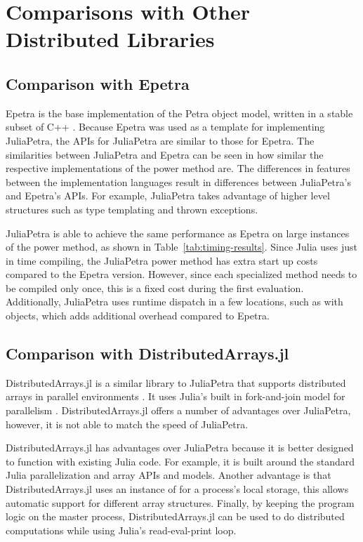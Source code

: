 \documentclass[acmsmall]{acmart}
\newcommand{\snippet}[1]{\texttt{\detokenize{#1}}}
\begin{document}
\section{Comparisons with Other Distributed Libraries}

\subsection{Comparison with Epetra}

Epetra is the base implementation of the Petra object model,
written in a stable subset of C++ \cite{Heroux:2005:Trilinos}.
Because Epetra was used as a template for implementing JuliaPetra,
the APIs for JuliaPetra are similar to those for Epetra.
The similarities between JuliaPetra and Epetra can be seen in how similar the respective implementations
of the power method are.
The differences in features between the implementation languages result in differences
between JuliaPetra's and Epetra's APIs.
For example, JuliaPetra takes advantage of higher level structures
such as type templating and thrown exceptions.

JuliaPetra is able to achieve the same performance as Epetra on large instances of the power method,
as shown in Table~\ref{tab:timing-results}.
Since Julia uses just in time compiling, the JuliaPetra power method has extra start up costs compared to
the Epetra version. However, since each specialized method needs to be compiled only once,
this is a fixed cost during the first evaluation.
Additionally, JuliaPetra uses runtime dispatch in a few locations, such as with
\snippet{Comm} objects, which adds additional overhead compared to Epetra.

\subsection{Comparison with DistributedArrays.jl}

DistributedArrays.jl is a similar library to JuliaPetra that supports
distributed arrays in parallel environments \cite{Github:DA}.
It uses Julia's built in fork-and-join model for parallelism
\cite{Bezanson:2017:FreshApproach}.
DistributedArrays.jl offers a number of advantages over JuliaPetra, however, it is not able to
match the speed of JuliaPetra.

DistributedArrays.jl has advantages over JuliaPetra because it is better designed to function with
existing Julia code.
For example, it is built around the standard Julia parallelization and array APIs and models.
Another advantage is that DistributedArrays.jl uses an instance of \snippet{AbstractArray}
for a process's local storage, this allows automatic support for different array structures.
Finally, by keeping the program logic on the master process, DistributedArrays.jl can be used to
do distributed computations while using Julia's read-eval-print loop.
\end{document}
